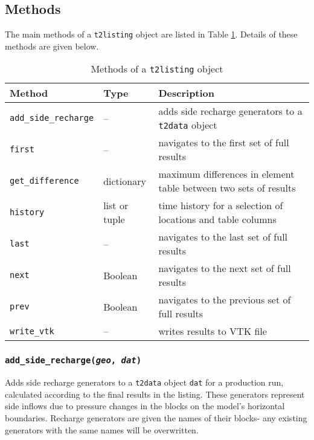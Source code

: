 \subsection{Methods}
\label{t2listingmethods}

The main methods of a \texttt{t2listing} object are listed in Table \ref{tb:t2listing_methods}.  Details of these methods are given below.

\begin{table}
  \begin{center}
    \begin{tabular}{|l|l|p{80mm}|}
      \hline
      \textbf{Method} & \textbf{Type} & \textbf{Description}\\
      \hline
      \texttt{add\_side\_recharge} & -- & adds side recharge generators to a \texttt{t2data} object\\
      \texttt{first} & -- & navigates to the first set of full results\\
      \texttt{get\_difference} & dictionary & maximum differences in element table between two sets of results\\
      \texttt{history} & list or tuple & time history for a selection of locations and table columns\\
      \texttt{last} & -- & navigates to the last set of full results\\
      \texttt{next} & Boolean & navigates to the next set of full results\\
      \texttt{prev} & Boolean & navigates to the previous set of full results\\
      \texttt{write\_vtk} & -- & writes results to VTK file\\
      \hline
    \end{tabular}
    \caption{Methods of a \texttt{t2listing} object}
    \label{tb:t2listing_methods}
  \end{center}
\end{table}

\subsubsection{\texttt{add\_side\_recharge(\emph{geo}, \emph{dat})}}

Adds side recharge generators to a \texttt{t2data} object \texttt{dat} for a production run, calculated according to the final results in the listing.  These generators represent side inflows due to pressure changes in the blocks on the model's horizontal boundaries.  Recharge generators are given the names of their blocks- any existing generators with the same names will be overwritten.

